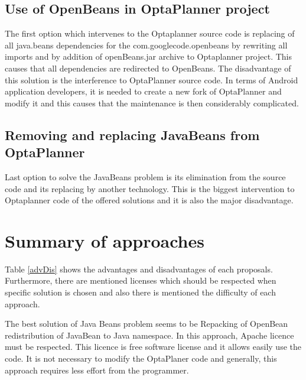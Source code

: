 \subsection{Use of OpenBeans in OptaPlanner project}
The first option which intervenes to the Optaplanner source code is replacing of all java.beans dependencies for the com.googlecode.openbeans by rewriting all imports and by addition of openBeans.jar archive to Optaplanner project. This causes that all dependencies are redirected to OpenBeans. The disadvantage of this solution is the interference to OptaPlanner source code. In terms of Android application developers, it is needed to create a new fork of OptaPlanner and modify it and this causes that the maintenance is then considerably complicated.

\subsection{Removing and replacing JavaBeans from OptaPlanner}
Last option to solve the JavaBeans problem is its elimination from the source code and its replacing by another technology. This is the biggest intervention to Optaplanner code of the offered solutions and it is also the major disadvantage.

\section{Summary of approaches}\label{summary}
Table \ref{advDis} shows the advantages and disadvantages of each proposals. Furthermore, there are mentioned licenses which should be respected when specific solution is chosen and also there is mentioned the difficulty of each approach.

The best solution of Java Beans problem seems to be Repacking of OpenBean redistribution of JavaBean to Java namespace. In this approach, Apache licence must be respected. This licence is free software license and it allows easily use the code. It is not necessary to modify the OptaPlaner code and generally, this approach requires less effort from the programmer.

